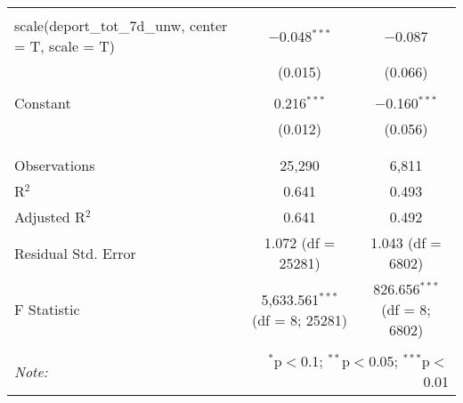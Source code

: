 \begin{table}[!htbp]
\begin{tabular}{@{\extracolsep{5pt}}lcc}
  & & \\ 
 scale(deport\_tot\_7d\_unw, center = T, scale = T) & $-$0.048$^{***}$ & $-$0.087 \\ 
  & (0.015) & (0.066) \\ 
  & & \\ 
 Constant & 0.216$^{***}$ & $-$0.160$^{***}$ \\ 
  & (0.012) & (0.056) \\ 
  & & \\ 
\hline \\[-1.8ex] 
Observations & 25,290 & 6,811 \\ 
R$^{2}$ & 0.641 & 0.493 \\ 
Adjusted R$^{2}$ & 0.641 & 0.492 \\ 
Residual Std. Error & 1.072 (df = 25281) & 1.043 (df = 6802) \\ 
F Statistic & 5,633.561$^{***}$ (df = 8; 25281) & 826.656$^{***}$ (df = 8; 6802) \\ 
\hline 
\hline \\[-1.8ex] 
\textit{Note:}  & \multicolumn{2}{r}{$^{*}$p$<$0.1; $^{**}$p$<$0.05; $^{***}$p$<$0.01} \\ 
\end{tabular} 
\end{table} 
